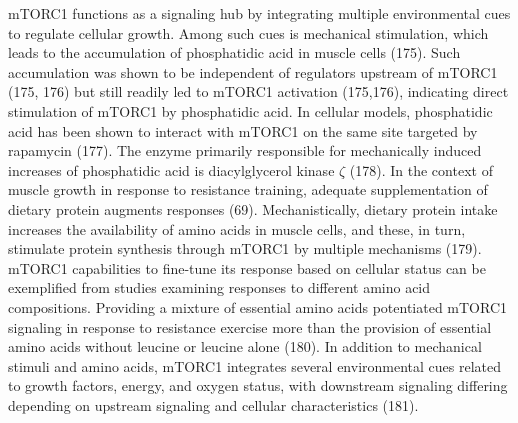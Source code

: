 \documentclass[twoside,10pt]{gihclass} %
\begin{document}
mTORC1 functions as a signaling hub by integrating multiple environmental cues to regulate cellular growth. Among such cues is mechanical stimulation, which leads to the accumulation of phosphatidic acid in muscle cells
(175).
Such accumulation was shown to be independent of regulators upstream of mTORC1
(175, 176)
but still readily led to mTORC1 activation
(175,176),
indicating direct stimulation of mTORC1 by phosphatidic acid.
In cellular models, phosphatidic acid has been shown to interact with mTORC1 on the same site targeted by rapamycin
(177).
The enzyme primarily responsible for mechanically induced increases of phosphatidic acid is diacylglycerol kinase \(\zeta\)
(178).
In the context of muscle growth in response to resistance training, adequate supplementation of dietary protein augments responses
(69).
Mechanistically, dietary protein intake increases the availability of amino acids in muscle cells, and these, in turn, stimulate protein synthesis through mTORC1 by multiple mechanisms
(179).
mTORC1 capabilities to fine-tune its response based on cellular status can be exemplified from studies examining responses to different amino acid compositions.
Providing a mixture of essential amino acids potentiated mTORC1 signaling in response to resistance exercise more than the provision of essential amino acids without leucine or leucine alone
(180).
In addition to mechanical stimuli and amino acids, mTORC1 integrates several environmental cues related to growth factors, energy, and oxygen status, with downstream signaling differing depending on upstream signaling and cellular characteristics
(181).
\end{document}
